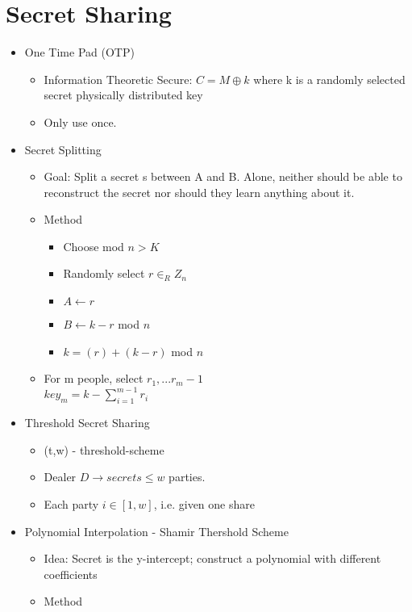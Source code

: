 \section{Secret Sharing}
\begin{itemize}
\item One Time Pad (OTP)
    \begin{itemize}
    \item Information Theoretic Secure: $C = M \oplus k$ where k is a randomly selected secret physically distributed key
    \item Only use once.
    \end{itemize}
\item Secret Splitting
    \begin{itemize}
    \item Goal: Split a secret s between A and B. Alone, neither should be able to reconstruct the secret nor should they learn anything about it.
    \item Method
        \begin{itemize}
        \item Choose mod $n > K$
        \item Randomly select $r \in_R Z_n$
        \item $A \leftarrow r$
        \item $B \leftarrow k-r$ mod $n$
        \item $k = (r) + (k-r)$ mod $n$
        \end{itemize}
    \item For m people, select $r_1, ... r_m-1$
        \\$key_m = k - \sum_{i=1}^{m-1} r_i$
    \end{itemize}
\item Threshold Secret Sharing
    \begin{itemize}
    \item (t,w) - threshold-scheme
    \item Dealer $D \rightarrow secrets \le w$ parties.
    \item Each party $i \in [1,w]$, i.e. given one share
    \end{itemize}
\item Polynomial Interpolation - Shamir Thershold Scheme
    \begin{itemize}
    \item Idea: Secret is the y-intercept; construct a polynomial with different coefficients
    \item Method
        \begin{itemize}

\end{itemize}
\end{itemize}
\end{itemize}
